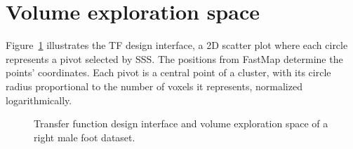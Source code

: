 \section{Volume exploration space}
\label{sect:volume-exploration-space}

Figure~\ref{fig:tf-design-example} illustrates the TF design interface, a 2D scatter plot where each circle represents a pivot selected by SSS. The positions from FastMap determine the points' coordinates. Each pivot is a central point of a cluster, with its circle radius proportional to the number of voxels it represents, normalized logarithmically.

\begin{figure}[htb!]
    \centering
    \hfill
    \caption{Transfer function design interface and volume exploration space of a right male foot dataset.}
    \label{fig:tf-design-example}
\end{figure}

